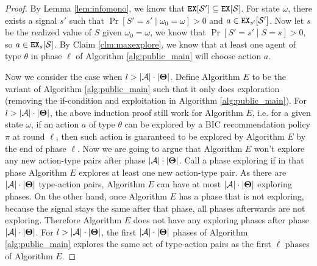 \begin{proof}
By Lemma \ref{lem:infomono}, we know that $\mathtt{EX}[\mathcal{S}'] \subseteq \mathtt{EX}[\mathcal{S}]$. For state $\omega$, there exists a signal $s'$ such that $\Pr[S'=s'\mid \omega_0 =\omega] >0 $ and $a \in \mathtt{EX}_{s'} [\mathcal{S}']$. Now let $s$ be the realized value of $S$ given $\omega_0 = \omega$, we know that $\Pr[S'=s'\mid S=s] >0$, so $a \in \mathtt{EX}_s[\mathcal{S}]$. By Claim \ref{clm:maxexplore}, we know that at least one agent of type $\theta$ in phase $\ell$ of Algorithm \ref{alg:public_main} will choose action $a$.

Now we consider the case when $l > |\mathcal{A}| \cdot |\bold{\Theta}|$. Define Algorithm $E$ to be the variant of Algorithm \ref{alg:public_main} such that it only does exploration (removing the if-condition and exploitation in Algorithm \ref{alg:public_main}). For $l > |\mathcal{A}| \cdot |\bold{\Theta}|$, the above induction proof still work for Algorithm $E$, i.e. for a given state $\omega$, if an action $a$ of type $\theta$ can be explored by a BIC recommendation policy $\pi$ at round $\ell$, then such action is guaranteed to be explored by Algorithm $E$ by the end of phase $\ell$. Now we are going to argue that Algorithm $E$ won't explore any new action-type pairs after phase $|\mathcal{A}| \cdot |\bold{\Theta}|$. Call a phase exploring if in that phase Algorithm $E$ explores at least one new action-type pair. As there are  $ |\mathcal{A}| \cdot |\bold{\Theta}|$ type-action pairs, Algorithm $E$ can have at most $ |\mathcal{A}| \cdot |\bold{\Theta}|$ exploring phases. On the other hand, once Algorithm $E$ has a phase that is not exploring, because the signal stays the same after that phase, all phases afterwards are not exploring. Therefore Algorithm $E$ does not have any exploring phases after phase $|\mathcal{A}| \cdot |\bold{\Theta}|$. For $l > |\mathcal{A}| \cdot |\bold{\Theta}|$, the first $|   \mathcal{A}| \cdot |\bold{\Theta}|$ phases of Algorithm \ref{alg:public_main} explores the same set of type-action pairs as the first $\ell$ phases of Algorithm $E$.
\end{proof}

